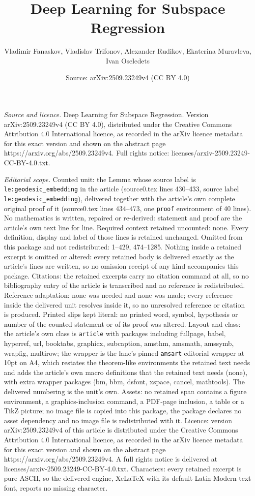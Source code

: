 \documentclass[10pt,a4paper]{amsart}
\title[Deep Learning for Subspace Regression]{Deep Learning for Subspace Regression}
\author{Vladimir Fanaskov, Vladislav Trifonov, Alexander Rudikov, Ekaterina Muravleva, Ivan Oseledets}
\date{Source: arXiv:2509.23249v4 (CC BY 4.0)}
\begin{document}
\maketitle

\noindent\emph{Source and licence.} Deep Learning for Subspace Regression. Version arXiv:2509.23249v4 (CC BY 4.0), distributed under the Creative Commons Attribution 4.0 International licence, as recorded in the arXiv licence metadata for this exact version and shown on the abstract page https://arxiv.org/abs/2509.23249v4. Full rights notice: licenses/arxiv-2509.23249-CC-BY-4.0.txt.\par\smallskip

\noindent\textit{Editorial scope.} Counted unit: the Lemma whose source label is \texttt{le:geodesic\_embedding} in the article (source0.tex lines 430--433, source label \texttt{le:geodesic\_embedding}), delivered together with the article's own complete original proof of it (source0.tex lines 434--473, one \texttt{proof} environment of 40 lines). No mathematics is written, repaired or re-derived: statement and proof are the article's own text line for line. Required context retained uncounted: none. Every definition, display and label of those lines is retained unchanged. Omitted from this package and not redistributed: 1--429, 474--1285. Nothing inside a retained excerpt is omitted or altered: every retained body is delivered exactly as the article's lines are written, so no omission receipt of any kind accompanies this package. Citations: the retained excerpts carry no citation command at all, so no bibliography entry of the article is transcribed and no reference is redistributed. Reference adaptation: none was needed and none was made; every reference inside the delivered unit resolves inside it, so no unresolved reference or citation is produced. Printed slips kept literal: no printed word, symbol, hypothesis or number of the counted statement or of its proof was altered. Layout and class: the article's own class is \texttt{article} with packages including fullpage, babel, hyperref, url, booktabs, graphicx, subcaption, amsthm, amsmath, amssymb, wrapfig, multirow; the wrapper is the lane's pinned \texttt{amsart} editorial wrapper at 10pt on A4, which restates the theorem-like environments the retained text needs and adds the article's own macro definitions that the retained text needs (none), with extra wrapper packages (bm, bbm, dsfont, xspace, cancel, mathtools). The delivered numbering is the unit's own. Assets: no retained span contains a figure environment, a graphics-inclusion command, a PDF-page inclusion, a table or a TikZ picture; no image file is copied into this package, the package declares no asset dependency and no image file is redistributed with it. Licence: version arXiv:2509.23249v4 of this article is distributed under the Creative Commons Attribution 4.0 International licence, as recorded in the arXiv licence metadata for this exact version and shown on the abstract page https://arxiv.org/abs/2509.23249v4. A full rights notice is delivered at licenses/arxiv-2509.23249-CC-BY-4.0.txt. Characters: every retained excerpt is pure ASCII, so the delivered engine, XeLaTeX with its default Latin Modern text font, reports no missing character.
\end{document}
